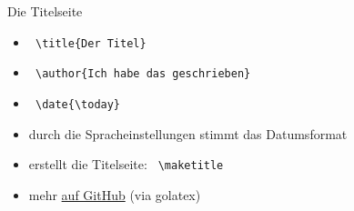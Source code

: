 
\begin{frame}[fragile]{Die Titelseite}
    \begin{itemize}
        \item \lstinline| \title{Der Titel}|
        \item \lstinline| \author{Ich habe das geschrieben}|
        \item \lstinline| \date{\today}|
        \item durch die Spracheinstellungen stimmt das Datumsformat
        \item erstellt die Titelseite: \lstinline| \maketitle|
        \item mehr \href{https://github.com/inktrap/LaTeXKurs/blob/master/2/tex/01-titlepage.tex}{auf GitHub} (via golatex)
    \end{itemize}
\end{frame}